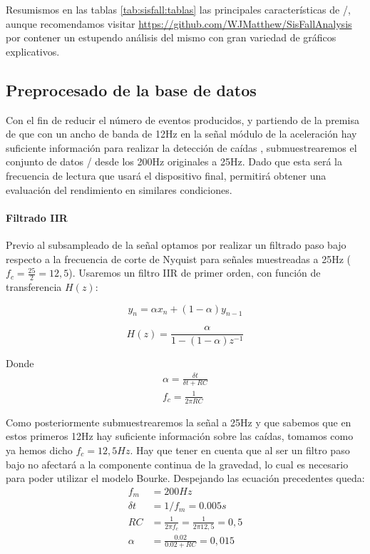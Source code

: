 Resumismos en las tablas \ref{tab:sisfall:tablas} las principales características de \sisfall/, aunque recomendamos visitar \url{https://github.com/WJMatthew/SisFallAnalysis} por contener un estupendo análisis del mismo con gran variedad de gráficos explicativos.

\subsection{Preprocesado de la base de datos}

Con el fin de reducir el número de eventos producidos, y partiendo de la premisa de que con un ancho de banda de 12Hz en la señal módulo de la aceleración hay suficiente información para realizar la detección de caídas \cite{Liu2018}, submuestrearemos el conjunto de datos \sisfall/ desde los 200Hz originales a 25Hz. Dado que esta será la frecuencia de lectura que usará el dispositivo final, permitirá obtener una evaluación del rendimiento en similares condiciones.

\paragraph{Filtrado IIR}

Previo al subsampleado de la señal optamos por realizar un filtrado paso bajo respecto a la frecuencia de corte de Nyquist para señales muestreadas a 25Hz ($f_c=\frac{25}{2}=12,5$). Usaremos un filtro IIR de primer orden, con función de transferencia $H(z)$:

\[
  y_n = \alpha x_n + (1-\alpha) y_{n-1}
\]


\[
  H(z) = \frac{\alpha}{1-(1-\alpha)z^{-1}}
\]

Donde
\begin{align*}
\alpha = \frac{\delta t}{\delta t + RC} \\
f_c= \frac{1}{2 \pi RC}
\end{align*}

Como posteriormente submuestrearemos la señal a 25Hz y que sabemos que en estos primeros 12Hz hay suficiente información sobre las caídas, tomamos como ya hemos dicho $f_c=12,5Hz$. Hay que tener en cuenta que al ser un filtro paso bajo no afectará a la componente continua de la gravedad, lo cual es necesario para poder utilizar el modelo Bourke. Despejando las ecuación precedentes queda:
\begin{align*}
  f_m & = 200{Hz}\\
  \delta t & = 1/f_m = 0.005s\\
  RC & =\frac{1}{2\pi f_c} = \frac{1}{2\pi12,5} = 0,5\\
  \alpha & = \frac{0.02}{0.02 + RC} = 0,015
\end{align*}

